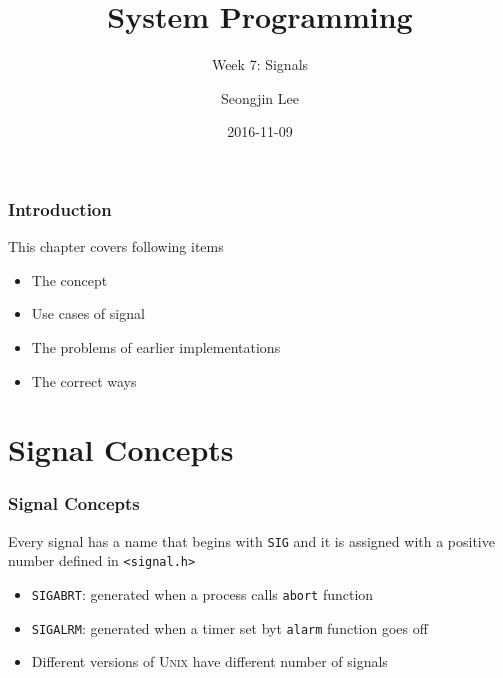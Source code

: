 \documentclass[newPxFont,sthlmFooter,nooffset]{beamer}
\title{System Programming}
\subtitle{Week 7: Signals}
\author[SJL]{Seongjin Lee}
\institute{\href{mailto:insight@hanyang.ac.kr}{insight@hanyang.ac.kr}\\\url{http://esos.hanyang.ac.kr}\\Esos Lab. Hanyang University}
\date{2016-11-09}
\begin{document}
\frame[plain]{\titlepage} 






\begin{frame}[t]
  \frametitle{Introduction}
This chapter covers following items
  \begin{itemize}
  \item The concept
  \item Use cases of signal
  \item The problems of earlier implementations
  \item The correct ways
  \end{itemize}

\end{frame}

\section{Signal Concepts}



\begin{frame}[t]
  \frametitle{Signal Concepts}

Every signal has a name that begins with \texttt{SIG} and it is assigned with a positive number defined in \texttt{<signal.h>}
\begin{itemize}
\item \texttt{SIGABRT}: generated when a process calls \texttt{abort} function
\item \texttt{SIGALRM}: generated when a timer set byt \texttt{alarm} function goes off
\item Different versions of \textsc{Unix} have different number of signals
\end{itemize}
\end{frame}
\end{document}
